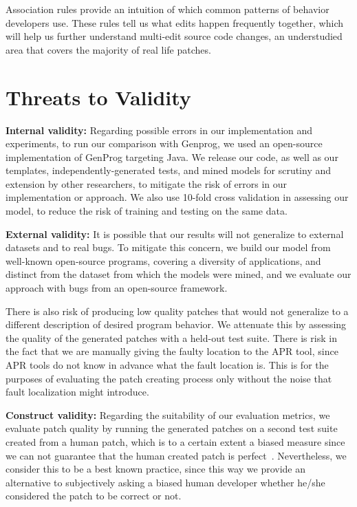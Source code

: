 \documentclass[conference]{IEEEtran}
\begin{document}
Association rules provide an intuition of which common patterns of behavior
developers use. These rules tell us what edits happen frequently together, which
will help us further understand multi-edit source code changes, an understudied 
area that covers the majority of real life patches.

\section{Threats to Validity} \label{threatsVal}

\noindent\textbf{Internal validity:}
Regarding possible errors in our implementation and experiments, to run our
comparison with Genprog, we used an open-source implementation of GenProg
targeting Java. We release our code, as well as our templates,
independently-generated tests, and mined models for scrutiny and extension by other
researchers, to mitigate the risk of errors in our implementation or approach. 
 We also use 10-fold cross validation in
assessing our model, to reduce the risk of training and testing on the same
data.  

\noindent\textbf{External validity:} 
It is possible 
that our results will not generalize to external datasets and to
real bugs. To mitigate this concern, we build our model from well-known open-source
programs, covering a diversity of applications, and distinct from the dataset
from which the models were mined, and we evaluate our approach with bugs from an open-source framework.

There is also risk of producing low quality patches that would not 
generalize
to a different description of desired program behavior. We attenuate 
this by 
assessing the quality of the generated patches with a held-out test suite.
There is risk in the fact that we are manually giving the
faulty location to the APR tool, since APR tools do not know in advance what the 
fault location is. This is for the purposes of evaluating the patch creating 
process
only without the noise that fault localization might introduce.

\noindent\textbf{Construct validity:}
Regarding the suitability of our evaluation metrics, we evaluate patch
quality by running the generated patches on a second test suite created
from a human patch, which is to a certain extent a biased measure since we can
not guarantee that the human created patch is perfect~\cite{smith15}. Nevertheless, we consider 
this to be a
best known practice, since this way we provide an alternative to subjectively 
asking a biased human developer
whether he/she considered the patch to be correct or not. 
\end{document}

